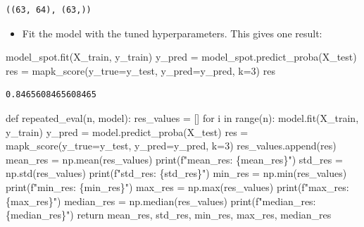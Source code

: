 \documentclass[
  letterpaper,
  DIV=11,
  numbers=noendperiod]{scrreprt}
\newenvironment{Shaded}{\begin{snugshade}}{\end{snugshade}}
\newcommand{\BuiltInTok}[1]{\textcolor[rgb]{0.00,0.23,0.31}{#1}}
\newcommand{\ControlFlowTok}[1]{\textcolor[rgb]{0.00,0.23,0.31}{#1}}
\newcommand{\DecValTok}[1]{\textcolor[rgb]{0.68,0.00,0.00}{#1}}
\newcommand{\KeywordTok}[1]{\textcolor[rgb]{0.00,0.23,0.31}{#1}}
\newcommand{\NormalTok}[1]{\textcolor[rgb]{0.00,0.23,0.31}{#1}}
\newcommand{\OperatorTok}[1]{\textcolor[rgb]{0.37,0.37,0.37}{#1}}
\newcommand{\SpecialCharTok}[1]{\textcolor[rgb]{0.37,0.37,0.37}{#1}}
\newcommand{\SpecialStringTok}[1]{\textcolor[rgb]{0.13,0.47,0.30}{#1}}
\providecommand{\tightlist}{%
  \setlength{\itemsep}{0pt}\setlength{\parskip}{0pt}}\usepackage{longtable,booktabs,array}
\begin{document}
\begin{verbatim}
((63, 64), (63,))
\end{verbatim}

\begin{itemize}
\tightlist
\item
  Fit the model with the tuned hyperparameters. This gives one result:
\end{itemize}

\begin{Shaded}
\begin{Highlighting}[]
\NormalTok{model\_spot.fit(X\_train, y\_train)}
\NormalTok{y\_pred }\OperatorTok{=}\NormalTok{ model\_spot.predict\_proba(X\_test)}
\NormalTok{res }\OperatorTok{=}\NormalTok{ mapk\_score(y\_true}\OperatorTok{=}\NormalTok{y\_test, y\_pred}\OperatorTok{=}\NormalTok{y\_pred, k}\OperatorTok{=}\DecValTok{3}\NormalTok{)}
\NormalTok{res}
\end{Highlighting}
\end{Shaded}

\begin{verbatim}
0.8465608465608465
\end{verbatim}

\begin{Shaded}
\begin{Highlighting}[]
\KeywordTok{def}\NormalTok{ repeated\_eval(n, model):}
\NormalTok{    res\_values }\OperatorTok{=}\NormalTok{ []}
    \ControlFlowTok{for}\NormalTok{ i }\KeywordTok{in} \BuiltInTok{range}\NormalTok{(n):}
\NormalTok{        model.fit(X\_train, y\_train)}
\NormalTok{        y\_pred }\OperatorTok{=}\NormalTok{ model.predict\_proba(X\_test)}
\NormalTok{        res }\OperatorTok{=}\NormalTok{ mapk\_score(y\_true}\OperatorTok{=}\NormalTok{y\_test, y\_pred}\OperatorTok{=}\NormalTok{y\_pred, k}\OperatorTok{=}\DecValTok{3}\NormalTok{)}
\NormalTok{        res\_values.append(res)}
\NormalTok{    mean\_res }\OperatorTok{=}\NormalTok{ np.mean(res\_values)}
    \BuiltInTok{print}\NormalTok{(}\SpecialStringTok{f"mean\_res: }\SpecialCharTok{\{}\NormalTok{mean\_res}\SpecialCharTok{\}}\SpecialStringTok{"}\NormalTok{)}
\NormalTok{    std\_res }\OperatorTok{=}\NormalTok{ np.std(res\_values)}
    \BuiltInTok{print}\NormalTok{(}\SpecialStringTok{f"std\_res: }\SpecialCharTok{\{}\NormalTok{std\_res}\SpecialCharTok{\}}\SpecialStringTok{"}\NormalTok{)}
\NormalTok{    min\_res }\OperatorTok{=}\NormalTok{ np.}\BuiltInTok{min}\NormalTok{(res\_values)}
    \BuiltInTok{print}\NormalTok{(}\SpecialStringTok{f"min\_res: }\SpecialCharTok{\{}\NormalTok{min\_res}\SpecialCharTok{\}}\SpecialStringTok{"}\NormalTok{)}
\NormalTok{    max\_res }\OperatorTok{=}\NormalTok{ np.}\BuiltInTok{max}\NormalTok{(res\_values)}
    \BuiltInTok{print}\NormalTok{(}\SpecialStringTok{f"max\_res: }\SpecialCharTok{\{}\NormalTok{max\_res}\SpecialCharTok{\}}\SpecialStringTok{"}\NormalTok{)}
\NormalTok{    median\_res }\OperatorTok{=}\NormalTok{ np.median(res\_values)}
    \BuiltInTok{print}\NormalTok{(}\SpecialStringTok{f"median\_res: }\SpecialCharTok{\{}\NormalTok{median\_res}\SpecialCharTok{\}}\SpecialStringTok{"}\NormalTok{)}
    \ControlFlowTok{return}\NormalTok{ mean\_res, std\_res, min\_res, max\_res, median\_res}
\end{Highlighting}
\end{Shaded}
\end{document}
